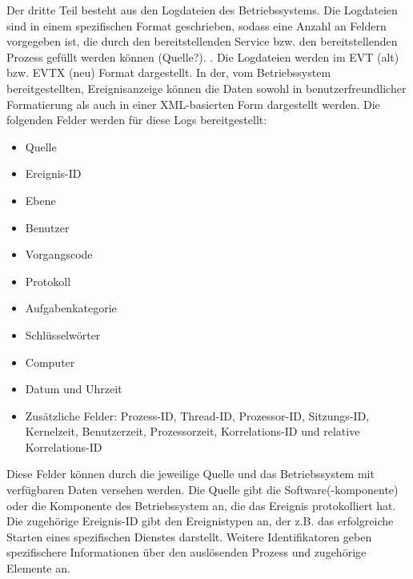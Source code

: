 Der dritte Teil besteht aus den Logdateien des Betriebssystems. 
Die Logdateien sind in einem spezifischen Format geschrieben, sodass eine Anzahl an Feldern vorgegeben ist, die durch den bereitstellenden Service bzw. den bereitstellenden Prozess gefüllt werden können (Quelle?). . Die Logdateien werden im EVT (alt) bzw. EVTX (neu) Format dargestellt. In der, vom Betriebssystem bereitgestellten, Ereignisanzeige können die Daten sowohl in benutzerfreundlicher Formatierung als auch in einer XML-basierten Form dargestellt werden. Die folgenden Felder werden für diese Logs bereitgestellt:
\begin{itemize}
\item Quelle
\item Ereignis-ID
\item Ebene
\item Benutzer
\item Vorgangscode
\item Protokoll
\item Aufgabenkategorie
\item Schlüsselwörter
\item Computer
\item Datum und Uhrzeit
\item Zusätzliche Felder: Prozess-ID, Thread-ID, Prozessor-ID, Sitzungs-ID, Kernelzeit, Benutzerzeit, Prozessorzeit, Korrelations-ID und relative Korrelations-ID
\end{itemize}
Diese Felder können durch die jeweilige Quelle und das Betriebssystem mit verfügbaren Daten versehen werden. Die Quelle gibt die Software(-komponente) oder die Komponente des Betriebssystem an, die das Ereignis protokolliert hat. Die zugehörige Ereignis-ID gibt den Ereignistypen an, der z.B. das erfolgreiche Starten eines spezifischen Dienstes darstellt. Weitere Identifikatoren geben spezifischere Informationen über den auslösenden Prozess und zugehörige Elemente an. 
